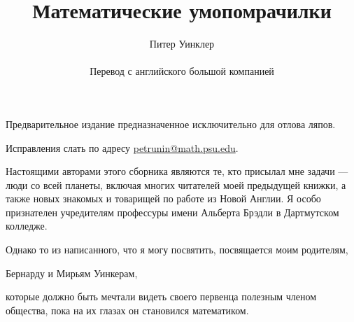 \documentclass[twoside]{book}
\def\thetitle{Математические умопомрачилки} %
\def\theauthor{Питер Уинклер}
\begin{document}

\title{\thetitle}
\author{\theauthor\\
\\
Перевод с английского большой компанией}
\date{}
\maketitle

\thispagestyle{empty}

Предварительное издание предназначенное исключительно для отлова ляпов. 

Исправления слать по адресу 
\url{petrunin@math.psu.edu}.

\vfill

\pagebreak

Настоящими авторами этого сборника являются те, кто присылал мне задачи --- люди со всей планеты, включая многих читателей моей предыдущей книжки, а также новых знакомых и товарищей по работе из Новой Англии.
Я особо признателен учредителям профессуры имени Альберта Брэдли в Дартмутском колледже.

Однако то из написанного, что я могу посвятить, посвящается моим родителям,
\begin{center}
Бернарду и Мирьям Уинкерам,
\end{center}
которые должно быть мечтали видеть своего первенца полезным членом общества, пока на их глазах он становился математиком.

\thispagestyle{empty}






















\appendix

{
\small

\printindex

}

{

\sloppy

\printbibliography[heading=bibintoc]


\fussy

}

\newpage

{

\tableofcontents

}
\end{document}
